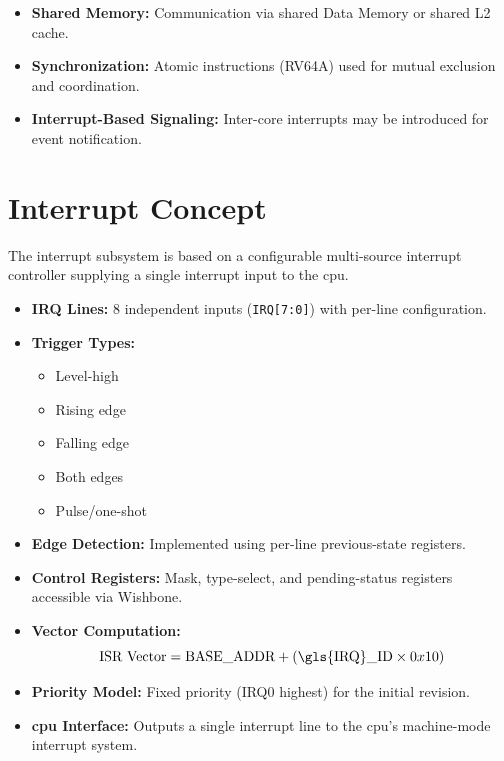\begin{itemize}
    \item \textbf{Shared Memory:}
          Communication via shared Data Memory or shared L2 cache.
    \item \textbf{Synchronization:}
          Atomic instructions (RV64A) used for mutual exclusion and coordination.
    \item \textbf{Interrupt-Based Signaling:}
          Inter-core interrupts may be introduced for event notification.
\end{itemize}

\section{Interrupt Concept}
The interrupt subsystem is based on a configurable multi-source interrupt
controller supplying a single interrupt input to the \gls{cpu}.

\begin{itemize}
      \item \textbf{\gls{IRQ} Lines:} 8 independent inputs (\texttt{\gls{IRQ}[7:0]}) with per-line configuration.
      \item \textbf{Trigger Types:}
            \begin{itemize}
                  \item Level-high
                  \item Rising edge
                  \item Falling edge
                  \item Both edges
                  \item Pulse/one-shot
            \end{itemize}
      \item \textbf{Edge Detection:} Implemented using per-line previous-state registers.
      \item \textbf{Control Registers:}
            Mask, type-select, and pending-status registers accessible via Wishbone.
      \item \textbf{Vector Computation:}
            \[
                  \text{ISR Vector} = \text{BASE\_ADDR} + (\text{\gls{IRQ}\_ID} \times 0x10)
            \]
      \item \textbf{Priority Model:} Fixed priority (IRQ0 highest) for the initial revision.
      \item \textbf{\gls{cpu} Interface:} Outputs a single interrupt line to the \gls{cpu}'s machine-mode interrupt system.
\end{itemize}

